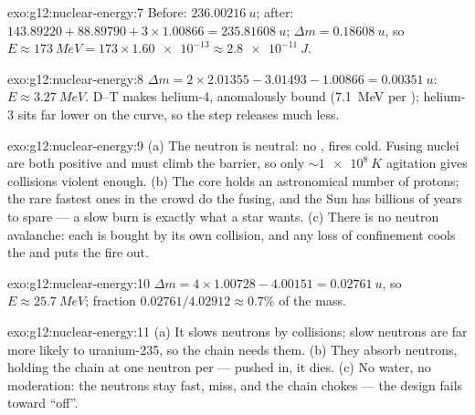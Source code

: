 \begin{solution}{exo:g12:nuclear-energy:7}
Before: $\qty{236.00216}{u}$; after: $143.89220 + 88.89790 +
3 \times 1.00866 = \qty{235.81608}{u}$; $\Delta m = \qty{0.18608}{u}$,
so $E \approx \qty{173}{MeV} = 173 \times \num{1.60e-13} \approx
\qty{2.8e-11}{J}$.
\end{solution}

\begin{solution}{exo:g12:nuclear-energy:8}
$\Delta m = 2 \times 2.01355 - 3.01493 - 1.00866 = \qty{0.00351}{u}$:
$E \approx \qty{3.27}{MeV}$. D--T makes helium-4, anomalously bound
(\qty{7.1}{MeV} per ); helium-3 sits far lower on the curve, so
the step releases much less.
\end{solution}

\begin{solution}{exo:g12:nuclear-energy:9}
(a) The neutron is neutral: no ,  fires cold.
Fusing nuclei are both positive and must climb the barrier, so only
$\sim \qty{1e8}{K}$ agitation gives collisions violent enough. (b) The
core holds an astronomical number of protons; the rare fastest ones in
the crowd do the fusing, and the Sun has billions of years to spare
--- a slow burn is exactly what a star wants. (c) There is no neutron
avalanche: each  is bought by its own collision, and any loss of
confinement cools the  and puts the fire out.
\end{solution}

\begin{solution}{exo:g12:nuclear-energy:10}
$\Delta m = 4 \times 1.00728 - 4.00151 = \qty{0.02761}{u}$, so
$E \approx \qty{25.7}{MeV}$; fraction
$0.02761/4.02912 \approx 0.7\%$ of the mass.
\end{solution}

\begin{solution}{exo:g12:nuclear-energy:11}
(a) It slows  neutrons by collisions; slow neutrons are far
more likely to  uranium-235, so the chain needs them. (b) They
absorb neutrons, holding the chain at one neutron per  ---
pushed in, it dies. (c) No water, no moderation: the neutrons stay
fast, miss, and the chain chokes --- the design fails toward
``off''.
\end{solution}

